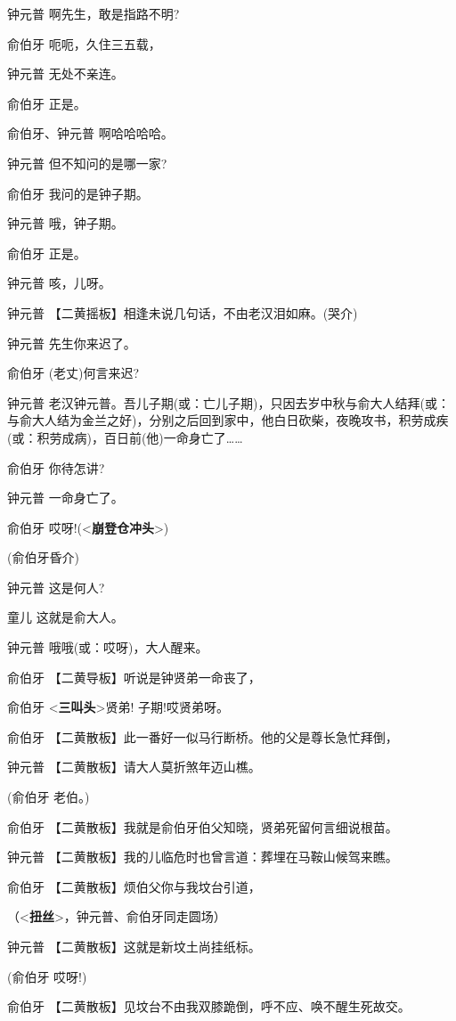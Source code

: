 钟元普 啊先生，敢是指路不明?

俞伯牙 呃呃，久住三五载，

钟元普 无处不亲连。

俞伯牙 正是。

俞伯牙、钟元普 啊哈哈哈哈。

钟元普 但不知问的是哪一家?

俞伯牙 我问的是钟子期。

钟元普 哦，钟子期。

俞伯牙 正是。

钟元普 咳，儿呀。

钟元普 【二黄摇板】相逢未说几句话，不由老汉泪如麻。(哭介)

钟元普 先生你来迟了。

俞伯牙 (老丈)何言来迟?

钟元普
老汉钟元普。吾儿子期(或：亡儿子期)，只因去岁中秋与俞大人结拜(或：与俞大人结为金兰之好)，分别之后回到家中，他白日砍柴，夜晚攻书，积劳成疾(或：积劳成病)，百日前(他)一命身亡了\ldots{}\ldots{}

俞伯牙 你待怎讲?

钟元普 一命身亡了。

俞伯牙 哎呀!(\textless{}\textbf{崩登仓冲头}\textgreater{})

(俞伯牙昏介)

钟元普 这是何人?

童儿 这就是俞大人。

钟元普 哦哦(或：哎呀)，大人醒来。

俞伯牙 【二黄导板】听说是钟贤弟一命丧了，

俞伯牙 \textless{}\textbf{三叫头}\textgreater{}贤弟! 子期!哎贤弟呀。

俞伯牙 【二黄散板】此一番好一似马行断桥。他的父是尊长急忙拜倒，

钟元普 【二黄散板】请大人莫折煞年迈山樵。

(俞伯牙 老伯。)

俞伯牙 【二黄散板】我就是俞伯牙伯父知晓，贤弟死留何言细说根苗。

钟元普 【二黄散板】我的儿临危时也曾言道：葬埋在马鞍山候驾来瞧。

俞伯牙 【二黄散板】烦伯父你与我坟台引道，

（\textless{}\textbf{扭丝}\textgreater{}，钟元普、俞伯牙同走圆场）

钟元普 【二黄散板】这就是新坟土尚挂纸标。

(俞伯牙 哎呀!)

俞伯牙 【二黄散板】见坟台不由我双膝跪倒，呼不应、唤不醒生死故交。


